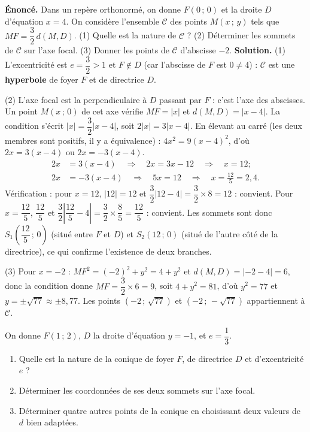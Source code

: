 \documentclass[11pt]{article}
\begin{document}
\begin{exoresolu}
\textbf{Énoncé.} Dans un repère orthonormé, on donne $F(0\,;\,0)$ et la droite $D$ d'équation $x = 4$. On considère l'ensemble $\mathcal{C}$ des points $M(x\,;\,y)$ tels que $MF = \dfrac{3}{2}\,d(M, D)$. (1) Quelle est la nature de $\mathcal{C}$ ? (2) Déterminer les sommets de $\mathcal{C}$ sur l'axe focal. (3) Donner les points de $\mathcal{C}$ d'abscisse $-2$.
\tcblower
\textbf{Solution.} (1) L'excentricité est $e = \dfrac{3}{2} > 1$ et $F \notin D$ (car l'abscisse de $F$ est $0 \neq 4$) : $\mathcal{C}$ est une \textbf{hyperbole} de foyer $F$ et de directrice $D$.

(2) L'axe focal est la perpendiculaire à $D$ passant par $F$ : c'est l'axe des abscisses. Un point $M(x\,;\,0)$ de cet axe vérifie $MF = |x|$ et $d(M, D) = |x - 4|$. La condition s'écrit $|x| = \dfrac{3}{2}|x-4|$, soit $2|x| = 3|x-4|$. En élevant au carré (les deux membres sont positifs, il y a équivalence) : $4x^2 = 9(x-4)^2$, d'où $2x = 3(x-4)$ ou $2x = -3(x-4)$.
\begin{align*}
2x &= 3(x-4) \quad\Rightarrow\quad 2x = 3x - 12 \quad\Rightarrow\quad x = 12 ; \\
2x &= -3(x-4) \quad\Rightarrow\quad 5x = 12 \quad\Rightarrow\quad x = \tfrac{12}{5} = 2,4.
\end{align*}
Vérification : pour $x = 12$, $|12| = 12$ et $\dfrac32|12-4| = \dfrac32 \times 8 = 12$ : convient. Pour $x = \dfrac{12}{5}$, $\dfrac{12}{5}$ et $\dfrac32\left|\dfrac{12}{5} - 4\right| = \dfrac32 \times \dfrac85 = \dfrac{12}{5}$ : convient. Les sommets sont donc $S_1\left(\dfrac{12}{5}\,;\,0\right)$ (situé entre $F$ et $D$) et $S_2(12\,;\,0)$ (situé de l'autre côté de la directrice), ce qui confirme l'existence de deux branches.

(3) Pour $x = -2$ : $MF^2 = (-2)^2 + y^2 = 4 + y^2$ et $d(M,D) = |-2 - 4| = 6$, donc la condition donne $MF = \dfrac32 \times 6 = 9$, soit $4 + y^2 = 81$, d'où $y^2 = 77$ et $y = \pm\sqrt{77} \approx \pm 8,77$. Les points $(-2\,;\,\sqrt{77})$ et $(-2\,;\,-\sqrt{77})$ appartiennent à $\mathcal{C}$.
\end{exoresolu}

\begin{exercice}
On donne $F(1\,;\,2)$, $D$ la droite d'équation $y = -1$, et $e = \dfrac{1}{3}$.
\begin{enumerate}
\item Quelle est la nature de la conique de foyer $F$, de directrice $D$ et d'excentricité $e$ ?
\item Déterminer les coordonnées de ses deux sommets sur l'axe focal.
\item Déterminer quatre autres points de la conique en choisissant deux valeurs de $d$ bien adaptées.
\end{enumerate}
\end{exercice}
\end{document}
